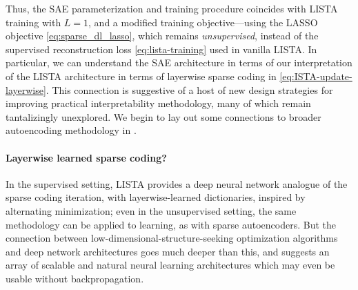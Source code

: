 \documentclass[../../book-main.tex]{subfiles}
\begin{document}
Thus, the SAE parameterization and training procedure coincides with
LISTA training with $L=1$, and a modified training objective---using the
LASSO objective \eqref{eq:sparse_dl_lasso}, which remains {\em unsupervised}, instead
of the supervised reconstruction loss \eqref{eq:lista-training} used in vanilla
LISTA. In particular, we can understand the SAE architecture in terms of our
interpretation of the LISTA architecture in terms of layerwise sparse coding in
\eqref{eq:ISTA-update-layerwise}. This connection is suggestive of a host of new
design strategies for improving practical interpretability methodology, many of
which remain tantalizingly unexplored. We begin to lay out some connections to
broader autoencoding methodology in .



\paragraph{Layerwise learned sparse coding?}



In the supervised setting, LISTA provides a deep neural network analogue of
the sparse coding iteration, with layerwise-learned dictionaries, inspired by
alternating minimization; even in the unsupervised setting, the same methodology
can be applied to learning, as with sparse autoencoders.
But the connection between low-dimensional-structure-seeking optimization algorithms 
and deep network architectures goes much deeper than this, and suggests an array
of scalable and natural neural learning architectures which may even be usable
without backpropagation.
\end{document}
